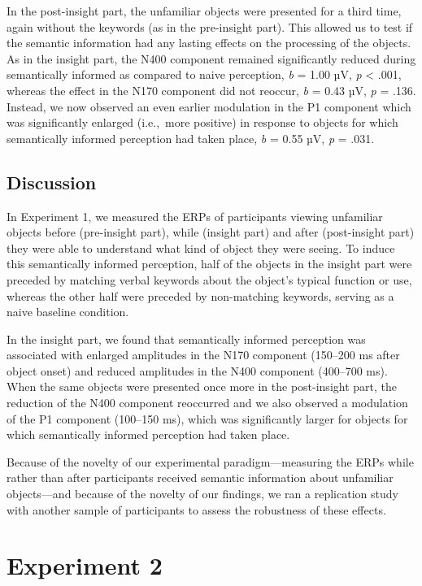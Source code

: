 \documentclass[
  english,
  doc,12pt,twoside,floatsintext]{apa7}
\begin{document}
In the post-insight part, the unfamiliar objects were presented for a third time, again without the keywords (as in the pre-insight part). This allowed us to test if the semantic information had any lasting effects on the processing of the objects. As in the insight part, the N400 component remained significantly reduced during semantically informed as compared to naive perception, \emph{b} = 1.00 µV, \emph{p} \textless{} .001, whereas the effect in the N170 component did not reoccur, \emph{b} = 0.43 µV, \emph{p} = .136. Instead, we now observed an even earlier modulation in the P1 component which was significantly enlarged (i.e.,~more positive) in response to objects for which semantically informed perception had taken place, \emph{b} = 0.55 µV, \emph{p} = .031.

\hypertarget{discussion}{%
\subsection{Discussion}\label{discussion}}

In Experiment 1, we measured the ERPs of participants viewing unfamiliar objects before (pre-insight part), while (insight part) and after (post-insight part) they were able to understand what kind of object they were seeing. To induce this semantically informed perception, half of the objects in the insight part were preceded by matching verbal keywords about the object's typical function or use, whereas the other half were preceded by non-matching keywords, serving as a naive baseline condition.

In the insight part, we found that semantically informed perception was associated with enlarged amplitudes in the N170 component (150--200 ms after object onset) and reduced amplitudes in the N400 component (400--700 ms). When the same objects were presented once more in the post-insight part, the reduction of the N400 component reoccurred and we also observed a modulation of the P1 component (100--150 ms), which was significantly larger for objects for which semantically informed perception had taken place.

Because of the novelty of our experimental paradigm---measuring the ERPs while rather than after participants received semantic information about unfamiliar objects---and because of the novelty of our findings, we ran a replication study with another sample of participants to assess the robustness of these effects.

\hypertarget{experiment-2}{%
\section{Experiment 2}\label{experiment-2}}
\end{document}
